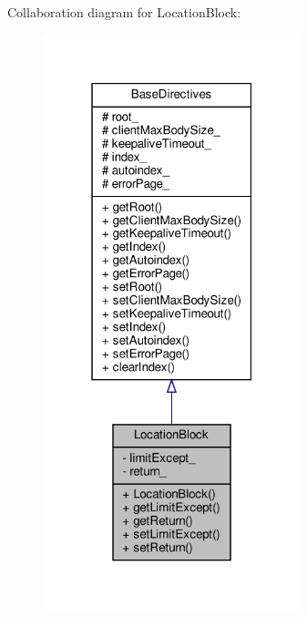 Collaboration diagram for Location\+Block\+:
\nopagebreak
\begin{figure}[H]
\begin{center}
\leavevmode
\includegraphics[width=211pt]{classft_1_1_location_block__coll__graph}
\end{center}
\end{figure}
